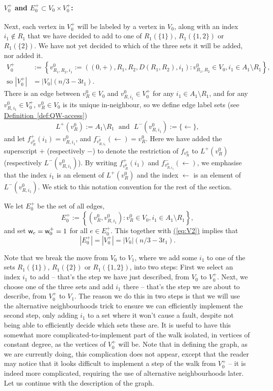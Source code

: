 \documentclass{theoretics}
\newcommand{\eq}[1]{\hyperref[eq:#1]{(\ref*{eq:#1})}}
\newcommand{\defin}[1]{\hyperref[def:#1]{Definition~\ref*{def:#1}}}
\renewcommand{\>}{\rangle}
\newcommand{\<}{\langle}
\renewcommand{\(}{\left(}
\renewcommand{\)}{\right)}
\def\w{{\sf w}}
\begin{document}
\paragraph{$V_0^+$ and $E_0^+\subset V_0\times V_0^+$:} Next, each vertex in $V_0^+$ will be labeled by a vertex in $V_0$, along with an index $i_1\not\in R_1$ that we have decided to add to one of $R_1(\{1\})$, $R_1(\{1,2\})$ or $R_1(\{2\})$. We have not yet decided to which of the three sets it will be added, nor added it. 
\begin{align}
V_0^+ &:=\left\{v^0_{R_1,R_2,i_1}:=((0,+),R_1,R_2,D(R_1,R_2),i_1): v^0_{R_1,R_2}\in V_0,i_1\in A_1\setminus R_1\right\},\nonumber\\
\mbox{so }|V_0^+| &= |V_0| (n/3-3t_1).\label{eq:V2}
\end{align}
There is an edge between $v^0_{R}\in V_0$ and $v^0_{R,i_1}\in V_0^+$ for any $i_1\in A_1\setminus R_1$, and for any $v^0_{R,i_1}\in V_0^+$, $v^0_{R}\in V_0$ is its unique in-neighbour, so we define edge label sets (see \defin{QW-access})
$$L^+(v_{R}^0):=A_1\setminus R_1
\;\mbox{ and }\;
L^-(v_{R,i_1}^0):=\{\leftarrow\},$$
and let $f^+_{v_{R}^0}(i_1) = v_{R,i_1}^0$, and $f^-_{v_{R,i_1}^0}(\leftarrow) = v_{R}^0$. Here we have added the superscript $+$ (respectively $-$) to denote the restriction of $f_{v_{R}^0}$ to $L^+(v_{R}^0)$ (respectively $L^-(v_{R,i_1}^0)$). By writing $f^+_{v_{R}^0}(i_1)$ and $f^-_{v_{R,i_1}^0}(\leftarrow)$, we emphasise that the index $i_1$ is an element of $L^+(v_{R}^0)$ and the index $\leftarrow$ is an element of $L^-(v_{R,i_1}^0)$. We stick to this notation convention for the rest of the section. 

\noindent We let $E_0^+$ be the set of all edges,
$$E_0^+:=\left\{\left(v^0_{R},v^0_{R,i_1}\right):v^0_{R}\in V_0, i_1 \in A_1 \setminus R_1\right\},$$
and set $\w_e = \w_0^+=1$ for all $e \in E_0^+$. This together with \eq{V2} implies that
\begin{equation}
|E_0^+|=|V_0^+|=|V_0|(n/3-3t_1).\label{eq:E1}
\end{equation}

Note that we break the move from $V_0$ to $V_1$, where we add some $i_1$ to one of the sets $R_1(\{1\})$, $R_1(\{2\})$ or $R_1(\{1,2\})$, into two steps: First we select an index $i_1$ to add -- that's the step we have just described, from $V_0$ to $V_0^+$. Next, we choose one of the three sets and add $i_1$ there -- that's the step we are about to describe, from $V_0^+$ to $V_1$. The reason we do this in two steps is that we will use the alternative neighbourhoods trick to ensure we can efficiently implement the second step, only adding $i_1$ to a set where it won't cause a fault, despite not being able to efficiently decide which sets these are. It is useful to have this somewhat more complicated-to-implement part of the walk isolated, in vertices of constant degree, as the vertices of $V_0^+$ will be. Note that in defining the graph, as we are currently doing, this complication does not appear, except that the reader may notice that it looks difficult to implement a step of the walk from $V_0^+$ -- it is indeed more complicated, requiring the use of alternative neighbourhoods later. Let us continue with the description of the graph.
\end{document}
